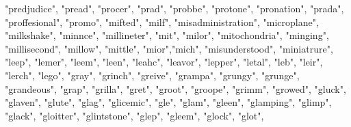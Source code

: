 \documentclass[
]{article}
\newenvironment{Shaded}{\begin{snugshade}}{\end{snugshade}}
\newcommand{\NormalTok}[1]{#1}
\newcommand{\StringTok}[1]{\textcolor[rgb]{0.31,0.60,0.02}{#1}}
\begin{document}
\begin{Shaded}
\begin{Highlighting}[]
                     \StringTok{"predjudice"}\NormalTok{, }\StringTok{"pread"}\NormalTok{, }\StringTok{"procer"}\NormalTok{, }\StringTok{"prad"}\NormalTok{, }\StringTok{"probbe"}\NormalTok{, }\StringTok{"protone"}\NormalTok{, }\StringTok{"pronation"}\NormalTok{, }\StringTok{"prada"}\NormalTok{,}
                     \StringTok{"proffesional"}\NormalTok{, }\StringTok{"promo"}\NormalTok{,}
                     \StringTok{"mifted"}\NormalTok{, }\StringTok{"milf"}\NormalTok{, }\StringTok{"misadministration"}\NormalTok{, }\StringTok{"microplane"}\NormalTok{, }\StringTok{"milkshake"}\NormalTok{, }\StringTok{"minnce"}\NormalTok{, }
                     \StringTok{"millineter"}\NormalTok{, }\StringTok{"mit"}\NormalTok{, }\StringTok{"milor"}\NormalTok{, }\StringTok{"mitochondria"}\NormalTok{, }\StringTok{"minging"}\NormalTok{, }\StringTok{"millisecond"}\NormalTok{, }\StringTok{"millow"}\NormalTok{,}
                     \StringTok{"mittle"}\NormalTok{, }\StringTok{"mior"}\NormalTok{,}\StringTok{"mich"}\NormalTok{, }\StringTok{"misunderstood"}\NormalTok{, }\StringTok{"miniatrure"}\NormalTok{,}
                     \StringTok{"leep"}\NormalTok{, }\StringTok{"lemer"}\NormalTok{, }\StringTok{"leem"}\NormalTok{, }\StringTok{"leen"}\NormalTok{, }\StringTok{"leahc"}\NormalTok{, }\StringTok{"leavor"}\NormalTok{, }\StringTok{"lepper"}\NormalTok{, }\StringTok{"letal"}\NormalTok{, }\StringTok{"leb"}\NormalTok{,}
                     \StringTok{"leir"}\NormalTok{, }\StringTok{"lerch"}\NormalTok{, }\StringTok{"lego"}\NormalTok{,}
                     \StringTok{"gray"}\NormalTok{, }\StringTok{"grinch"}\NormalTok{, }\StringTok{"greive"}\NormalTok{, }\StringTok{"grampa"}\NormalTok{, }\StringTok{"grungy"}\NormalTok{, }\StringTok{"grunge"}\NormalTok{, }\StringTok{"grandeous"}\NormalTok{, }\StringTok{"grap"}\NormalTok{,}
                     \StringTok{"grilla"}\NormalTok{, }\StringTok{"gret"}\NormalTok{, }\StringTok{"groot"}\NormalTok{, }\StringTok{"groope"}\NormalTok{, }\StringTok{"grimm"}\NormalTok{, }\StringTok{"growed"}\NormalTok{,}
                     \StringTok{"gluck"}\NormalTok{, }\StringTok{"glaven"}\NormalTok{, }\StringTok{"glute"}\NormalTok{, }\StringTok{"glag"}\NormalTok{, }\StringTok{"glicemic"}\NormalTok{, }\StringTok{"gle"}\NormalTok{, }\StringTok{"glam"}\NormalTok{, }\StringTok{"gleen"}\NormalTok{, }\StringTok{"glamping"}\NormalTok{,}
                     \StringTok{"glimp"}\NormalTok{, }\StringTok{"glack"}\NormalTok{, }\StringTok{"gloitter"}\NormalTok{, }\StringTok{"glintstone"}\NormalTok{, }\StringTok{"glep"}\NormalTok{, }\StringTok{"gleem"}\NormalTok{, }\StringTok{"glock"}\NormalTok{, }\StringTok{"glot"}\NormalTok{,}

\end{Highlighting}
\end{Shaded}
\end{document}
